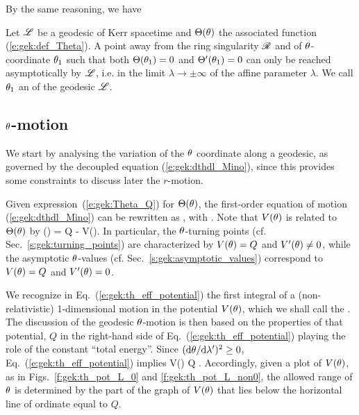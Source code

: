 By the same reasoning, we have
\begin{greybox}
Let $\mathscr{L}$ be a geodesic of Kerr spacetime and $\Theta(\theta)$ the associated function
(\ref{e:gek:def_Theta}).
A point away from the ring singularity $\mathscr{R}$ and of $\theta$-coordinate $\theta_1$
such that both $\Theta(\theta_1) = 0$ and $\Theta'(\theta_1) = 0$
can only be reached asymptotically by $\mathscr{L}$, i.e. in the limit
$\lambda\to \pm\infty$ of the affine parameter
$\lambda$. We call $\theta_1$ an
 of the geodesic $\mathscr{L}$.
\end{greybox}



\subsection{$\theta$-motion} \label{s:gek:th_motion}

We start by analysing the variation of the $\theta$ coordinate along a geodesic,
as governed by the decoupled equation
(\ref{e:gek:dthdl_Mino}), since this provides some constraints
to discuss later the $r$-motion.

Given expression~(\ref{e:gek:Theta_Q}) for $\Theta(\theta)$,
the first-order equation of motion (\ref{e:gek:dthdl_Mino}) can be rewritten as
\be \label{e:gek:th_eff_potential}
    ,
\ee
with
\be \label{e:gek:def_V_th}
  .
\ee
Note that $V(\theta)$ is related to $\Theta(\theta)$ by
\be
    \Theta(\th) = Q - V(\th).
\ee
In particular, the $\theta$-turning points (cf. Sec.~\ref{s:gek:turning_points})
are characterized by
$V(\theta) = Q$ and $V'(\theta) \neq 0$, while the asymptotic $\theta$-values
(cf. Sec.~\ref{s:gek:asymptotic_values})
correspond to $V(\theta) = Q$ and $V'(\theta) = 0$.

We recognize in Eq.~(\ref{e:gek:th_eff_potential}) the first integral of a
(non-relativistic) 1-dimensional motion in the potential $V(\theta)$, which we
shall call the
.
The discussion of the geodesic $\theta$-motion
is then based on the properties of that potential, $Q$
in the right-hand side of Eq.~(\ref{e:gek:th_eff_potential})
playing the role of
the constant ``total energy''. Since $(\mathrm{d}\theta / \mathrm{d}\lambda')^2 \geq 0$,
Eq.~(\ref{e:gek:th_eff_potential})  implies
\be \label{e:gek:V_leq_Q}
    V(\th) \leq Q .
\ee
Accordingly, given a plot of $V(\theta)$, as in Figs.~\ref{f:gek:th_pot_L_0} and
\ref{f:gek:th_pot_L_non0}, the allowed range of $\theta$ is determined
by the part of the graph of $V(\theta)$ that lies below
the horizontal line of ordinate equal to $Q$.

